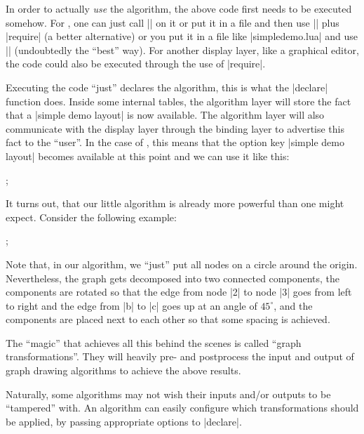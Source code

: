 In order to actually \emph{use} the algorithm, the above code first needs to be
executed somehow. For \tikzname, one can just call |\directlua| on it or put it
in a file and then use |\directlua| plus |require| (a better alternative) or
you put it in a file like |simpledemo.lua| and use ||
(undoubtedly the ``best'' way). For another display layer, like a graphical
editor, the code could also be executed through the use of |require|.

Executing the code ``just'' declares the algorithm, this is what the |declare|
function does. Inside some internal tables, the algorithm layer will store the
fact that a  |simple demo layout| is now available. The algorithm layer
will also communicate with the display layer through the binding layer to
advertise this fact to the ``user''. In the case of \tikzname, this means that
the option key |simple demo layout| becomes available at this point and we
can use it like this:
%
\begin{codeexample}[preamble={\usetikzlibrary{graphs,graphdrawing} \usegdlibrary{simpledemo}}]
  ;
\end{codeexample}

It turns out, that our little algorithm is already more powerful than one might
expect. Consider the following example:
%
\begin{codeexample}[preamble={\usetikzlibrary{graphs,graphdrawing} \usegdlibrary{simpledemo}}]
  ;
\end{codeexample}

Note that, in our algorithm, we ``just'' put all nodes on a circle around the
origin. Nevertheless, the graph gets decomposed into two connected components,
the components are rotated so that the edge from node |2| to node |3| goes from
left to right and the edge from |b| to |c| goes up at an angle of $45^\circ$,
and the components are placed next to each other so that some spacing is
achieved.

The ``magic'' that achieves all this behind the scenes is called ``graph
transformations''. They will heavily pre- and postprocess the input and output
of graph drawing algorithms to achieve the above results.

Naturally, some algorithms may not wish their inputs and/or outputs to be
``tampered'' with. An algorithm can easily configure which transformations
should be applied, by passing appropriate options to |declare|.


